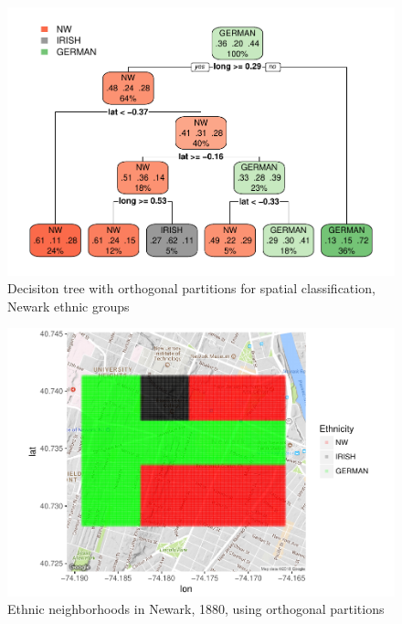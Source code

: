 \documentclass[]{elsarticle} %
\makeatletter
\def\maxwidth{\ifdim\Gin@nat@width>\linewidth\linewidth
\else\Gin@nat@width\fi}
\let\Oldincludegraphics\includegraphics
\renewcommand{\includegraphics}[1]{\Oldincludegraphics[width=\maxwidth]{#1}}
\makeatother
\begin{document}
\begin{figure}[htbp]
\centering
\includegraphics{Trees_with_Base_Functions_files/figure-latex/fig12-tree-orthogonal-newark-1.pdf}
\caption{\label{fig12-tree-orthogonal-newark}Decisiton tree with
orthogonal partitions for spatial classification, Newark ethnic groups}
\end{figure}

\begin{figure}[htbp]
\centering
\includegraphics{Trees_with_Base_Functions_files/figure-latex/fig13-map-orthogonal-newark-1.pdf}
\caption{\label{fig13-map-orthogonal-newark}Ethnic neighborhoods in
Newark, 1880, using orthogonal partitions}
\end{figure}
\end{document}
